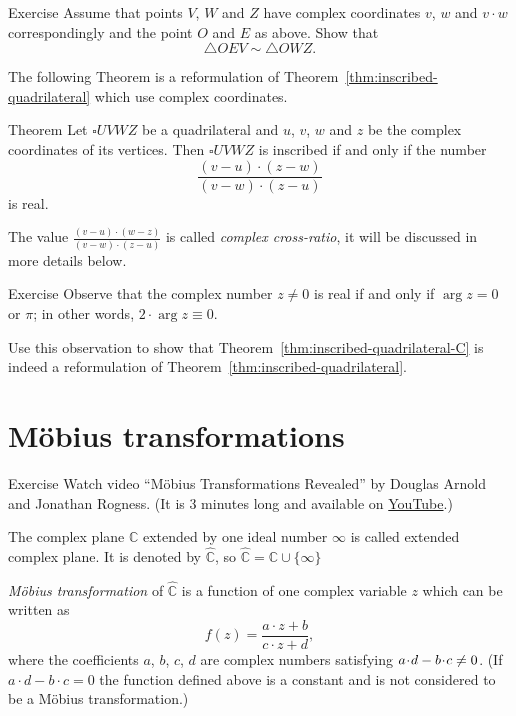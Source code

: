 \begin{thm}{Exercise}\label{ex:C-sim}
Assume that points $V$, $W$ and $Z$ have complex coordinates $v$, $w$ and $v\cdot w$ correspondingly and the point $O$ and $E$ as above.
Show that $$\triangle OEV\sim \triangle OWZ.$$

\end{thm}


The following Theorem is a reformulation of Theorem~\ref{thm:inscribed-quadrilateral} which use complex coordinates.


\begin{thm}{Theorem}\label{thm:inscribed-quadrilateral-C}
Let $\square UVWZ$ be a quadrilateral and $u$, $v$, $w$ and $z$ be the complex coordinates of its vertices. 
Then $\square UVWZ$ is inscribed 
if and only if the number
$$\frac{(v-u)\cdot(z-w)}{(v-w)\cdot(z-u)}$$ 
is real.
\end{thm}

The value $\frac{(v-u)\cdot(w-z)}{(v-w)\cdot(z-u)}$ is called 
\emph{complex cross-ratio}, it will be discussed in more details below.


\begin{thm}{Exercise}\label{ex:real-cross-ratio}
Observe that the complex number $z\ne 0$ is real if and only if $\arg z=0$ or $\pi$;
in other words, $2\cdot\arg z\equiv 0$.

Use this observation to show that Theorem~\ref{thm:inscribed-quadrilateral-C}
is indeed a reformulation of  Theorem~\ref{thm:inscribed-quadrilateral}.
\end{thm}



\section*{M\"obius transformations}

\begin{thm}{Exercise}\label{ex:movie}
Watch video ``M\"obius Transformations Revealed'' by Douglas Arnold and Jonathan Rogness.
(It is 3 minutes long and available on \href{http://youtu.be/0z1fIsUNhO4}{YouTube}.)
\end{thm}


The complex plane $\mathbb{C}$ extended by one ideal number $\infty$ 
is called  extended complex plane.
It is denoted by $\hat{\mathbb{C}}$, so $\hat{\mathbb{C}}=\mathbb{C}\cup\{\infty\}$

\emph{M\"obius transformation} of  $\hat{\mathbb{C}}$ is a function of one complex variable $z$
which can be written as
$$f(z) = \frac{a\cdot z + b}{c\cdot z + d},$$
where the coefficients $a$, $b$, $c$, $d$ are complex numbers satisfying $a\cdot d \z- b\cdot c \not= 0$.
(If $a\cdot d - b\cdot c = 0$ the function defined above is a constant and is not considered to be a M\"obius transformation.) 

